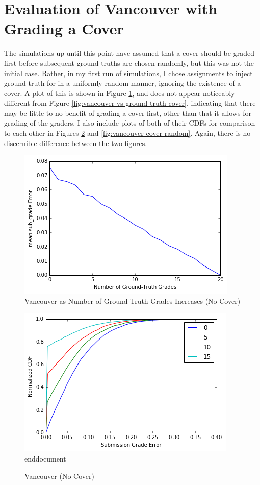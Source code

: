 \documentclass{article}
\begin{document}
	\section{Evaluation of Vancouver with Grading a Cover}
	The simulations up until this point have assumed that a cover should be graded first before subsequent ground truths are chosen randomly, but this was not the initial case. Rather, in my first run of simulations, I chose assignments to inject ground truth for in a uniformly random manner, ignoring the existence of a cover. A plot of this is shown in Figure \ref{fig:vancouver-vs-ground-truth-no-cover}, and does not appear noticeably different from Figure \ref{fig:vancouver-vs-ground-truth-cover}, indicating that there may be little to no benefit of grading a cover first, other than that it allows for grading of the graders. I also include plots of both of their CDFs for comparison to each other in Figures \ref{fig:vancouver-no-cover} and \ref{fig:vancouver-cover-random}. Again, there is no discernible difference between the two figures.
	
	\begin{figure}[h]
		\includegraphics{vancouver-vs-ground-truth-no-cover.png}
		\caption{Vancouver as Number of Ground Truth Grades Increases (No Cover)}
		\label{fig:vancouver-vs-ground-truth-no-cover}
	\end{figure}
	
	\begin{figure}[h]
		\includegraphics{vancouver-no-cover.png}end{document}
		\caption{Vancouver (No Cover)}
		\label{fig:vancouver-no-cover}
	\end{figure}
	
\end{document}
